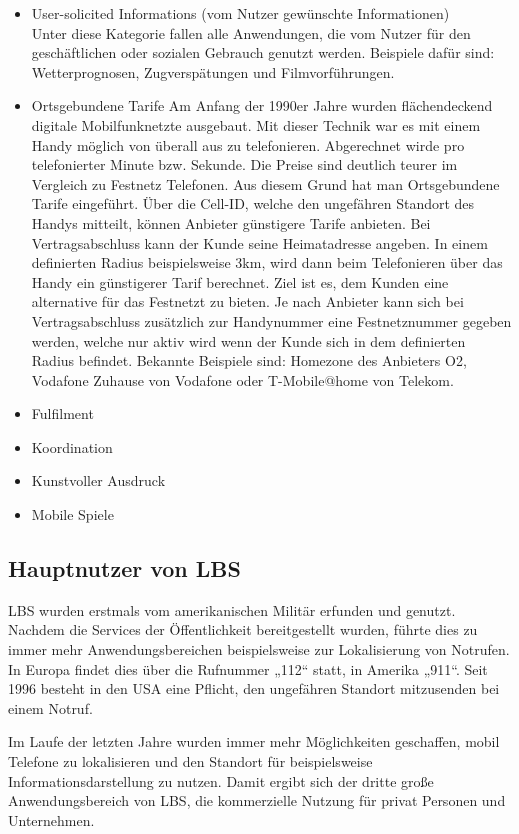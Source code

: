 \begin{itemize}
	\item User-solicited Informations (vom Nutzer gewünschte Informationen)\\
Unter diese Kategorie fallen alle Anwendungen, die vom Nutzer für den geschäftlichen oder sozialen Gebrauch genutzt werden. Beispiele dafür sind: Wetterprognosen, Zugverspätungen und Filmvorführungen.
	\item Ortsgebundene Tarife
	Am Anfang der 1990er Jahre wurden flächendeckend digitale Mobilfunknetzte ausgebaut. Mit dieser Technik war es mit einem Handy möglich von überall aus zu telefonieren. Abgerechnet wirde pro telefonierter Minute bzw. Sekunde. Die Preise sind deutlich teurer im Vergleich zu Festnetz Telefonen. Aus diesem Grund hat man Ortsgebundene Tarife eingeführt. Über die Cell-ID, welche den ungefähren Standort des Handys mitteilt, können Anbieter günstigere Tarife anbieten. Bei Vertragsabschluss kann der Kunde seine Heimatadresse angeben. In einem definierten Radius beispielsweise 3km, wird dann beim Telefonieren über das Handy ein günstigerer Tarif berechnet. Ziel ist es, dem Kunden eine alternative für das Festnetzt zu bieten. Je nach Anbieter kann sich bei Vertragsabschluss zusätzlich zur Handynummer eine Festnetznummer gegeben werden, welche nur aktiv wird wenn der Kunde sich in dem definierten Radius befindet. Bekannte Beispiele sind: Homezone des Anbieters O2, Vodafone Zuhause von Vodafone oder T-Mobile@home von Telekom.
	\item Fulfilment
	\item Koordination
	\item Kunstvoller Ausdruck
	\item Mobile Spiele
\end{itemize}


\subsection{Hauptnutzer von LBS}

LBS wurden erstmals vom amerikanischen Militär erfunden und genutzt. Nachdem die Services der Öffentlichkeit bereitgestellt wurden, führte dies zu immer mehr Anwendungsbereichen beispielsweise zur Lokalisierung von Notrufen. In Europa findet dies über die Rufnummer „112“ statt, in Amerika „911“.  Seit 1996 besteht in den USA eine Pflicht, den ungefähren Standort mitzusenden bei einem Notruf. 

Im Laufe der letzten Jahre wurden immer mehr Möglichkeiten geschaffen, mobil Telefone zu lokalisieren und den Standort für beispielsweise Informationsdarstellung zu nutzen. Damit ergibt sich der dritte große Anwendungsbereich von LBS, die kommerzielle Nutzung für privat Personen und Unternehmen.

